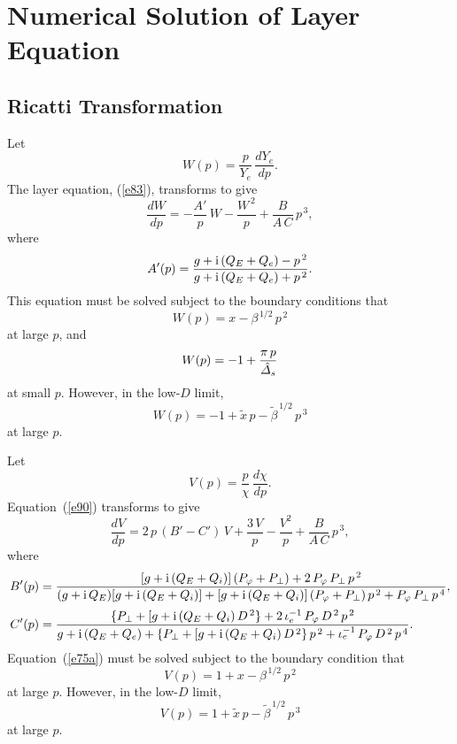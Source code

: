 \documentclass[titlepage=false,12pt]{article}
\begin{document}
\section{Numerical Solution of Layer Equation}
\subsection{Ricatti Transformation}
Let 
\begin{equation}
W(p)= \frac{p}{Y_e}\,\frac{dY_e}{dp}.
\end{equation}
The layer equation, (\ref{e83}), transforms to give
\begin{equation}\label{e72a}
\frac{dW}{dp} =- \frac{A'}{p}\,W -\frac{W^{\,2}}{p} + \frac{B}{A\,C}\,p^{\,3},
\end{equation}
where
\begin{equation}
A'(p) = \frac{g+{\rm i}\,(Q_E+Q_e)-p^{\,2}}{g+{\rm i}\,(Q_E+Q_e)+p^{\,2}}.
\end{equation}
This equation must be solved subject to the boundary conditions that
\begin{equation}\label{e63a}
W(p) = x-\beta^{\,1/2}\,p^{\,2}
\end{equation}
at large $p$, and
\begin{equation}\label{e73a}
W (p)=-1+\frac{\pi\,p}{\hat{\mit\Delta}_s}
\end{equation}
at small $p$. 
However, in the low-$D$ limit,
\begin{equation}\label{e63aa}
W(p) = -1 +\tilde{x}\,p-\tilde{\beta}^{\,1/2}\,p^{\,3}
\end{equation}
at large $p$. 

Let 
\begin{equation}
V(p)= \frac{p}{\chi}\,\frac{d\chi}{dp}.
\end{equation}
Equation~(\ref{e90}) transforms to give 
\begin{equation}\label{e75a}
\frac{dV}{dp} = 2\,p\,(B'-C')\,V + \frac{3\,V}{p} - \frac{V^2}{p} + \frac{B}{A\,C}\,p^{\,3},
\end{equation}
where 
\begin{align}
B'(p) &= \frac{ [g+{\rm i}\,(Q_E+Q_i)]\,(P_\varphi+P_\perp)+ 2\,P_\varphi\,P_\perp\,p^{\,2}}{ (g+{\rm i}\,Q_E)[g+{\rm i}\,(Q_E+Q_i)] + [g+{\rm i}\,(Q_E+Q_i)]\,(P_\varphi+P_\perp)\,p^{\,2}+ P_\varphi\,P_\perp\,p^{\,4}},\\[0.5ex]
C'(p)&=\frac{\{P_\perp + [g+{\rm i}\,(Q_E+Q_i)\,D^{\,2}\}+ 2\,\iota_e^{-1}\,P_\varphi\,D^{\,2}\,p^{\,2}}{g + {\rm i}\,(Q_E+Q_e) +\{P_\perp + [g+{\rm i}\,(Q_E+Q_i)\,D^{\,2}\}\,p^{\,2} + \iota_e^{-1}\,P_\varphi\,D^{\,2}\,p^{\,4}}.
\end{align}
Equation~(\ref{e75a}) must be solved subject to the boundary condition that
\begin{equation}\label{e77a}
V(p) = 1+x-\beta^{\,1/2}\,p^{\,2}
\end{equation}
at large $p$. 
However, in the low-$D$ limit,
\begin{equation}\label{e63ab}
V(p) = 1 +\tilde{x}\,p-\tilde{\beta}^{\,1/2}\,p^{\,3}
\end{equation}
at large $p$. 
\end{document}
